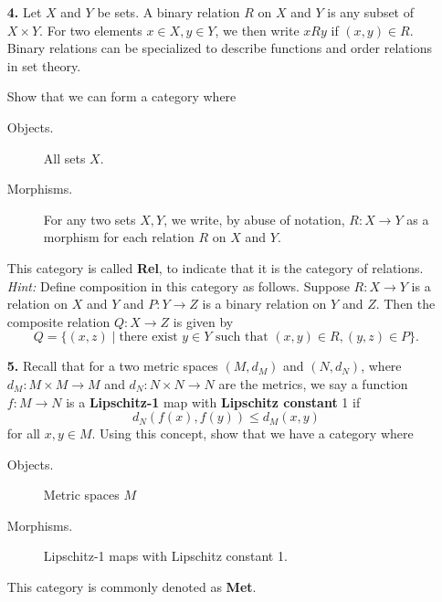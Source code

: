 \begin{itemize}
        \item[\textbf{4.}]
        Let $X$ and $Y$ be sets. A binary relation $R$ on $X$ and $Y$
        is any subset of $X \times Y$. For two elements 
        $x \in X, y \in Y$, we then write 
        $xRy$ if $(x,y) \in R$. Binary relations can be specialized to describe 
        functions and order relations in set theory.

        Show that we can form a category where 
        \begin{description}
            \item[Objects.] All sets $X$. 
            \item[Morphisms.] For any two sets $X,Y$, we write,
            by abuse of notation, $R: X \to Y$ as a morphism
            for each relation $R$ on $X$ and $Y$.
        \end{description}
        This category is called \textbf{Rel}, to indicate that it is the 
        category of relations.\\
        \emph{Hint:}  Define composition in this category as follows. Suppose 
        $R:X\to Y$ is a relation on $X$ and $Y$ and $P: Y \to Z$ is a binary relation on $Y$ and $Z$.
        Then the composite relation $Q: X \to Z$ is given by 
        \[
            Q = \{(x, z) \mid \text{there exist } y \in Y \text{ such that } (x,y)\in R, (y,z) \in P \}.
        \]

        \item[\textbf{5.}]
        Recall that for a two metric spaces $(M, d_M)$ and $(N, d_N)$, where 
        $d_M: M \times M \to M$ and $d_N: N \times N \to N$ are the metrics, 
        we say a function $f: M \to N$ is a \textbf{Lipschitz-1} map 
        with \textbf{Lipschitz constant} 1 if 
        \[
            d_N(f(x), f(y)) \le d_M(x, y)  
        \]
        for all $x, y \in M$. Using this concept, show that we have a category 
        where 
        \begin{description}
            \item[Objects.] Metric spaces $M$ 
            \item[Morphisms.] Lipschitz-1 maps with Lipschitz constant 1.   
        \end{description}
        This category is commonly denoted as \textbf{Met}.


\end{itemize}
